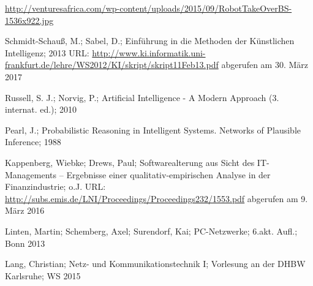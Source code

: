 \begin{thebibliography}{9999}

 \url{http://venturesafrica.com/wp-content/uploads/2015/09/RobotTakeOverBS-1536x922.jpg}

 Schmidt-Schauß, M.; Sabel, D.; Einführung in die Methoden der
Künstlichen Intelligenz; 2013 URL: \url{http://www.ki.informatik.uni-frankfurt.de/lehre/WS2012/KI/skript/skript11Feb13.pdf} abgerufen am 30. März 2017

 Russell, S. J.; Norvig, P.; Artificial Intelligence - A Modern Approach (3. internat. ed.); 2010

 Pearl, J.; Probabilistic Reasoning in Intelligent Systems. Networks of Plausible Inference; 1988
 
 Kappenberg, Wiebke; Drews, Paul; Softwarealterung aus Sicht des IT-Managements – Ergebnisse einer qualitativ-empirischen Analyse in der Finanzindustrie; o.J. URL: \url{http://subs.emis.de/LNI/Proceedings/Proceedings232/1553.pdf} abgerufen am 9. März 2016

 Linten, Martin; Schemberg, Axel; Surendorf, Kai; PC-Netzwerke; 6.akt. Aufl.; Bonn 2013

 Lang, Christian; Netz- und Kommunikationstechnik I; Vorlesung an der DHBW Karlsruhe; WS 2015

\end{thebibliography}
